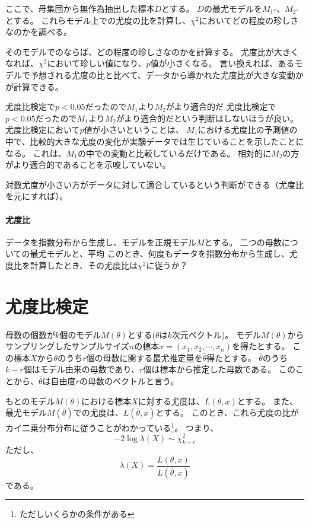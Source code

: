 ここで、母集団から無作為抽出した標本$D$とする。
$D$の最尤モデルを$M_{1''}$、$M_{2''}$とする。
これらモデル上での尤度の比を計算し、$\chi^2$においてどの程度の珍しさなのかを調べる。


そのモデルでのならば、どの程度の珍しさなのかを計算する。
尤度比が大きくなれば、$\chi^2$において珍しい値になり、$p$値が小さくなる。
言い換えれば、あるモデルで予想される尤度の比と比べて、データから導かれた尤度比が大きな変動かが計算できる。
\fi

\begin{SMbox}{尤度比検定で$p<0.05$だったので$M_1$より$M_2$がより適合的だ}
    尤度比検定で$p<0.05$だったので$M_1$より$M_2$がより適合的だという判断はしないほうが良い。
    尤度比検定において$p$値が小さいということは、
    $M_1$における尤度比の予測値の中で、比較的大きな尤度の変化が実験データでは生じていることを示したことになる。
    これは、$M_1$の中での変動と比較しているだけである。
    相対的に$M_2$の方がより適合的であることを示唆していない。
    
    対数尤度が小さい方がデータに対して適合しているという判断ができる（尤度比を元にすれば）。
\end{SMbox}
\paragraph{尤度比}
データを指数分布から生成し、モデルを正規モデル$M$とする。
二つの母数についての最尤モデルと、平均
このとき、何度もデータを指数分布から生成し、尤度比を計算したとき、その尤度比は$\chi^2$に従うか？
\fi

\section{尤度比検定}
母数の個数が$k$個のモデル$M(\theta)$とする($\theta$は$k$次元ベクトル)。
モデル$M(\theta)$からサンプリングしたサンプルサイズ$n$の標本$x=(x_1,x_2,\cdots,x_n)$を得たとする。
この標本$X$から$\theta$のうち$r$個の母数に関する最尤推定量を$\bar{\theta}$得たとする。
$\bar{\theta}$のうち$k-r$個はモデル由来の母数であり、$r$個は標本から推定した母数である。
このことから、$\bar{\theta}$は自由度$r$の母数のベクトルと言う。

もとのモデル$M(\theta)$における標本$X$に対する尤度は、$L(\theta,x)$とする。
また、最尤モデル$M(\bar{\theta})$での尤度は、$L(\bar{\theta},x)$とする。
このとき、これら尤度の比がカイ二乗分布分布に従うことがわかっている\footnote{ただしいくらかの条件がある}。
つまり、
\begin{equation*}
    -2\log\lambda(X)\sim \chi^2_{k-r}
\end{equation*}
ただし、
\begin{equation*}
    \lambda(X) = \frac{L(\theta,x)}{L(\bar{\theta},x)} 
\end{equation*}
である。

